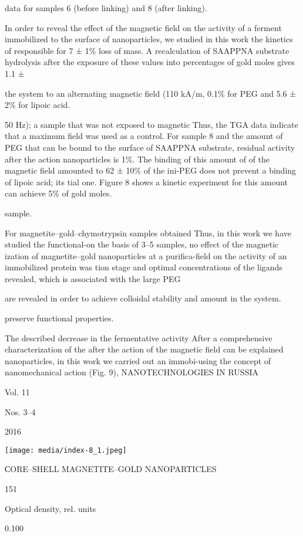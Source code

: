 \documentclass[12pt,a4paper]{article}
\begin{document}
data for samples 6 (before linking) and 8 (after linking).

In order to reveal the effect of the magnetic field on the activity of a
ferment immobilized to the surface of nanoparticles, we studied in this
work the kinetics of responsible for 7 ± 1\% loss of mass. A
recalculation of SAAPPNA substrate hydrolysis after the exposure of
these values into percentages of gold moles gives 1.1 ±

the system to an alternating magnetic field (110 kA/m, 0.1\% for PEG and
5.6 ± 2\% for lipoic acid.

50 Hz); a sample that was not exposed to magnetic Thus, the TGA data
indicate that a maximum field was used as a control. For sample 8 and
the amount of PEG that can be bound to the surface of SAAPPNA substrate,
residual activity after the action nanoparticles is 1\%. The binding of
this amount of of the magnetic field amounted to 62 ± 10\% of the
ini-PEG does not prevent a binding of lipoic acid; its tial one. Figure
8 shows a kinetic experiment for this amount can achieve 5\% of gold
moles.

sample.

For magnetite--gold--chymotrypsin samples obtained Thus, in this work we
have studied the functional-on the basis of 3--5 samples, no effect of
the magnetic ization of magnetite--gold nanoparticles at a
purifica-field on the activity of an immobilized protein was tion stage
and optimal concentrations of the ligands revealed, which is associated
with the large PEG

are revealed in order to achieve colloidal stability and amount in the
system.

preserve functional properties.

The described decrease in the fermentative activity After a
comprehensive characterization of the after the action of the magnetic
field can be explained nanoparticles, in this work we carried out an
immobi-using the concept of nanomechanical action (Fig. 9),
NANOTECHNOLOGIES IN RUSSIA

Vol. 11

Nos. 3--4

2016

\texttt{[image: media/index-8\_1.jpeg]}

СORE--SHELL MAGNETITE--GOLD NANOPARTICLES

151

Optical density, rel. units

0.100
\end{document}
